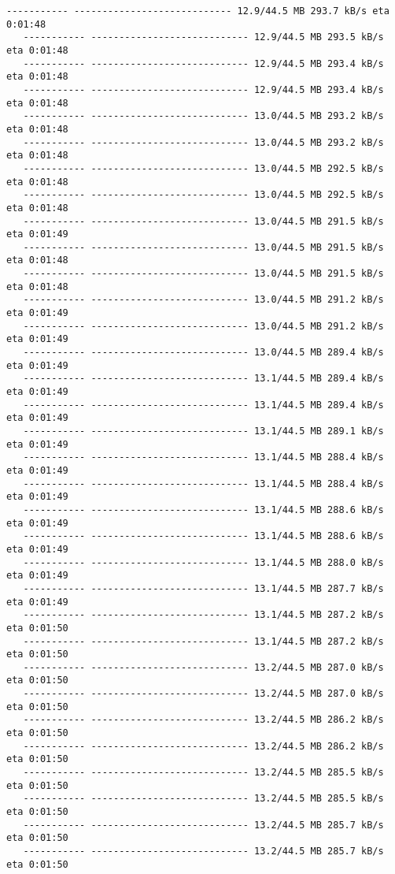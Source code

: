 \documentclass[11pt]{article}
\begin{document}
\begin{Verbatim}[commandchars=\\\{\}]
   ----------- ---------------------------- 12.9/44.5 MB 293.7 kB/s eta 0:01:48
   ----------- ---------------------------- 12.9/44.5 MB 293.5 kB/s eta 0:01:48
   ----------- ---------------------------- 12.9/44.5 MB 293.4 kB/s eta 0:01:48
   ----------- ---------------------------- 12.9/44.5 MB 293.4 kB/s eta 0:01:48
   ----------- ---------------------------- 13.0/44.5 MB 293.2 kB/s eta 0:01:48
   ----------- ---------------------------- 13.0/44.5 MB 293.2 kB/s eta 0:01:48
   ----------- ---------------------------- 13.0/44.5 MB 292.5 kB/s eta 0:01:48
   ----------- ---------------------------- 13.0/44.5 MB 292.5 kB/s eta 0:01:48
   ----------- ---------------------------- 13.0/44.5 MB 291.5 kB/s eta 0:01:49
   ----------- ---------------------------- 13.0/44.5 MB 291.5 kB/s eta 0:01:48
   ----------- ---------------------------- 13.0/44.5 MB 291.5 kB/s eta 0:01:48
   ----------- ---------------------------- 13.0/44.5 MB 291.2 kB/s eta 0:01:49
   ----------- ---------------------------- 13.0/44.5 MB 291.2 kB/s eta 0:01:49
   ----------- ---------------------------- 13.0/44.5 MB 289.4 kB/s eta 0:01:49
   ----------- ---------------------------- 13.1/44.5 MB 289.4 kB/s eta 0:01:49
   ----------- ---------------------------- 13.1/44.5 MB 289.4 kB/s eta 0:01:49
   ----------- ---------------------------- 13.1/44.5 MB 289.1 kB/s eta 0:01:49
   ----------- ---------------------------- 13.1/44.5 MB 288.4 kB/s eta 0:01:49
   ----------- ---------------------------- 13.1/44.5 MB 288.4 kB/s eta 0:01:49
   ----------- ---------------------------- 13.1/44.5 MB 288.6 kB/s eta 0:01:49
   ----------- ---------------------------- 13.1/44.5 MB 288.6 kB/s eta 0:01:49
   ----------- ---------------------------- 13.1/44.5 MB 288.0 kB/s eta 0:01:49
   ----------- ---------------------------- 13.1/44.5 MB 287.7 kB/s eta 0:01:49
   ----------- ---------------------------- 13.1/44.5 MB 287.2 kB/s eta 0:01:50
   ----------- ---------------------------- 13.1/44.5 MB 287.2 kB/s eta 0:01:50
   ----------- ---------------------------- 13.2/44.5 MB 287.0 kB/s eta 0:01:50
   ----------- ---------------------------- 13.2/44.5 MB 287.0 kB/s eta 0:01:50
   ----------- ---------------------------- 13.2/44.5 MB 286.2 kB/s eta 0:01:50
   ----------- ---------------------------- 13.2/44.5 MB 286.2 kB/s eta 0:01:50
   ----------- ---------------------------- 13.2/44.5 MB 285.5 kB/s eta 0:01:50
   ----------- ---------------------------- 13.2/44.5 MB 285.5 kB/s eta 0:01:50
   ----------- ---------------------------- 13.2/44.5 MB 285.7 kB/s eta 0:01:50
   ----------- ---------------------------- 13.2/44.5 MB 285.7 kB/s eta 0:01:50

\end{Verbatim}
\end{document}
